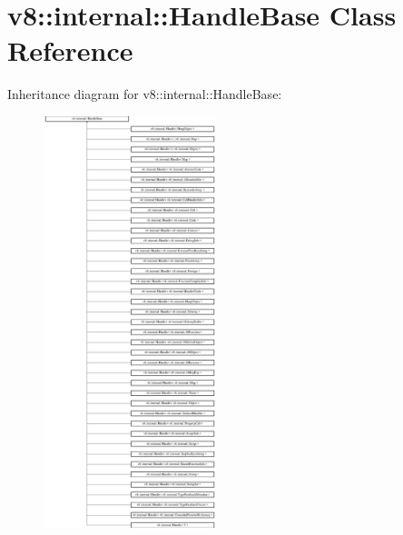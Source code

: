 \hypertarget{classv8_1_1internal_1_1_handle_base}{}\section{v8\+:\+:internal\+:\+:Handle\+Base Class Reference}
\label{classv8_1_1internal_1_1_handle_base}
Inheritance diagram for v8\+:\+:internal\+:\+:Handle\+Base\+:\begin{figure}[H]
\begin{center}
\leavevmode
\includegraphics[height=12.000000cm]{classv8_1_1internal_1_1_handle_base}
\end{center}
\end{figure}
